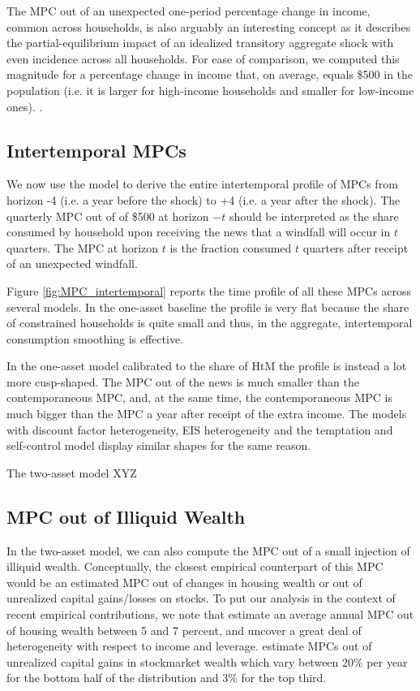 The MPC out of an unexpected one-period percentage change in income, common across households, is also arguably an interesting concept as it describes the partial-equilibrium impact of an idealized transitory aggregate shock with even incidence across all households. For ease of comparison, we computed this magnitude for a percentage change in income that, on average, equals \$500 in the population (i.e. it is larger for high-income households and smaller for low-income ones). . 

\subsection{Intertemporal MPCs}
\label{sec:other_mpcs_intertemporal}
We now use the model to derive the entire intertemporal profile of MPCs from horizon -4 (i.e. a year before the shock) to +4 (i.e. a year after the shock). The quarterly MPC out of of \$500 at horizon $-t$ should be interpreted as the share consumed by household upon receiving the news that a windfall will occur in $t$ quarters. The MPC at horizon $t$ is the fraction consumed $t$ quarters after receipt of an unexpected windfall.

Figure \ref{fig:MPC_intertemporal} reports the time profile of all these MPCs across several models. In the one-asset baseline the profile is very flat because the share of constrained households is quite small and thus, in the aggregate, intertemporal consumption smoothing is effective. 

In the one-asset model calibrated to the share of HtM the profile is instead a lot more cusp-shaped. The MPC out of the news is much smaller than the contemporaneous MPC, and, at the same time, the contemporaneous MPC is much bigger than the MPC a year after receipt of the extra income. The models with discount factor heterogeneity, EIS heterogeneity and the temptation and self-control model display similar shapes for the same reason.

The two-asset model XYZ

\subsection{MPC out of Illiquid Wealth} 
\label{sec:other_mpcs_illiquid}
In the two-asset model, we can also compute the MPC out of a small injection of illiquid wealth. Conceptually, the closest empirical counterpart of this MPC would be an estimated MPC out of changes in housing wealth or out of unrealized capital gains/losses on stocks. To put our analysis in the context of recent empirical contributions, we note that \citet{mian2013household} estimate an average annual MPC out of housing wealth between 5 and 7 percent, and uncover a great deal of heterogeneity with respect to income and leverage.\citet{di2020stock} estimate MPCs out of unrealized capital gains in stockmarket wealth which vary between 20\% per year for the bottom half of the distribution and 3\% for the top third. 

